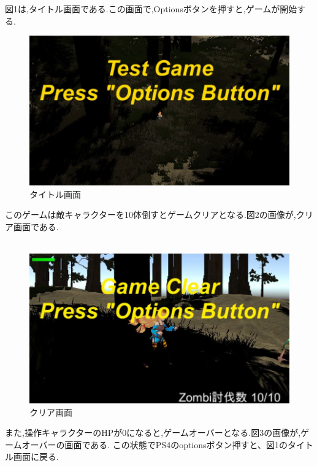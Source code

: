 \documentclass[a4paper]{jarticle}
\begin{document}
        図1は,タイトル画面である.この画面で,Optionsボタンを押すと,ゲームが開始する.\\
        
        \begin{figure}[h]
          \centering
          \includegraphics[keepaspectratio, scale=0.65]
               {images/Shindo/start.JPG}
          \caption{タイトル画面}
         \end{figure}
         
         このゲームは敵キャラクターを10体倒すとゲームクリアとなる.図2の画像が,クリア画面である.\\
        　
         \begin{figure}[h]
          \centering
          \includegraphics[keepaspectratio, scale=0.65]
               {images/Shindo/clear.JPG}
          \caption{クリア画面}
         \end{figure}
         
         また,操作キャラクターのHPが0になると,ゲームオーバーとなる.図3の画像が,ゲームオーバーの画面である.
         この状態でPS4のoptionsボタン押すと、図1のタイトル画面に戻る.\\
         
\end{document}
